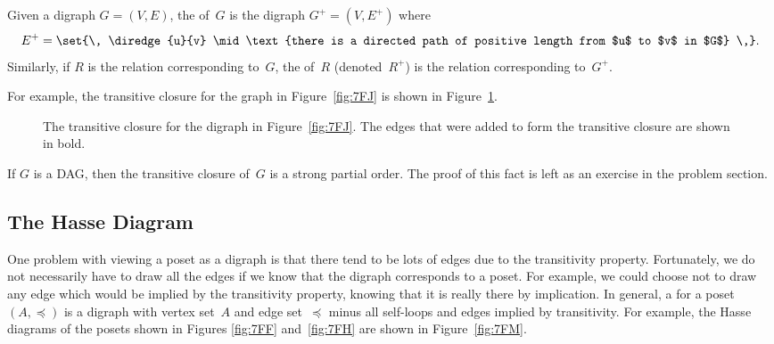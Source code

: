 \begin{definition}\label{def:transitive_closure}
Given a digraph $G = (V, E)$, the  of~$G$ is
the digraph $G^+ = (V, E^+)$ where
\begin{equation*}
    E^+ = \set{\, \diredge{u}{v} \mid \text{there is a directed path of
        positive length from $u$ to $v$ in $G$} \,}.
\end{equation*}
Similarly, if $R$ is the relation corresponding to~$G$, the
 of~$R$ (denoted~$R^+$) is the relation
corresponding to~$G^+$.
\end{definition}

For example, the transitive closure for the graph in
Figure~\ref{fig:7FJ} is shown in Figure~\ref{fig:7FK}.

\begin{figure}



\caption{The transitive closure for the digraph in
  Figure~\ref{fig:7FJ}.  The edges that were added to form the
  transitive closure are shown in bold.}

\label{fig:7FK}

\end{figure}

If $G$ is a DAG, then the transitive closure of~$G$ is a strong
partial order.  The proof of this fact is left as an exercise in the
problem section.

\subsection{The Hasse Diagram}

One problem with viewing a poset as a digraph is that there tend to be
lots of edges due to the transitivity property.  Fortunately, we do
not necessarily have to draw all the edges if we know that the digraph
corresponds to a poset.  For example, we could choose not to draw any
edge which would be implied by the transitivity property, knowing that
it is really there by implication.  In general, a 
for a poset~$(A, \preceq)$ is a digraph with vertex set~$A$ and edge
set~$\preceq$ minus all self-loops and edges implied by transitivity.
For example, the Hasse diagrams of the posets shown in Figures
\ref{fig:7FF} and~\ref{fig:7FH} are shown in Figure~\ref{fig:7FM}.

